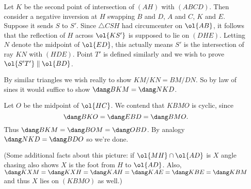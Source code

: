 Let $K$ be the second point of intersection of $(AH)$ with $(ABCD)$.
Then consider a negative inversion at $H$
swapping $B$ and $D$, $A$ and $C$, $K$ and $E$.
Suppose it sends $S$ to $S'$.
Since $\triangle CSH$ had circumcenter on $\ol{AB}$,
it follows that the reflection of $H$ across $\ol{KS'}$
is supposed to lie on $(DHE)$.
Letting $N$ denote the midpoint of $\ol{ED}$,
this actually means $S'$ is the intersection of ray $KN$ with $(HDE)$.
Point $T'$ is defined similarly
and we wish to prove $\ol{S'T'} \parallel \ol{BD}$.

By similar triangles we wish really to show $KM/KN = BM/DN$.
So by law of sines it would suffice to show $\dang BKM = \dang NKD$.

Let $O$ be the midpoint of $\ol{HC}$.
We contend that $KBMO$ is cyclic, since
\[ \dang BKO = \dang EBD = \dang BMO. \]
Thus $\dang BKM = \dang BOM = \dang OBD$.
By analogy $\dang NKD = \dang BDO$ so we're done.

(Some additional facts about this picture:
if $\ol{MH} \cap \ol{AD}$ is $X$ angle chasing also shows $X$
is the foot from $H$ to $\ol{AD}$.
Also, $\dang KXM = \dang KXH = \dang KAH = \dang KAE = \dang KBE = \dang KBM$
and thus $X$ lies on $(KBMO)$ as well.)
